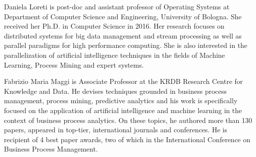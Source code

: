 \documentclass[10pt,journal,compsoc]{IEEEtran}
\theoremstyle{definition}
\theoremstyle{plain}
\begin{document}
\begin{IEEEbiography}{Daniela Loreti}
is post-doc and assistant professor of Operating Systems at Department of Computer Science and Engineering, University of Bologna. She received her Ph.D. in Computer Science in 2016. 
Her research focuses on distributed systems for big data management and stream processing as well as parallel paradigms for high performance computing. She is also interested in the parallelization of artificial intelligence techniques in the fields of Machine Learning, Process Mining and expert systems.
\end{IEEEbiography}

\begin{IEEEbiography}{Fabrizio Maria Maggi}
is Associate Professor at the KRDB Research Centre for Knowledge and Data. He devises techniques grounded in business process management, process mining, predictive analytics and his work is specifically focused on the application of artificial intelligence and machine learning in the context of business process analytics. On these topics, he authored more than 130 papers, appeared in top-tier, international journals and conferences. He is recipient of 4 best paper awards, two of which in the International Conference on Business Process Management. 
\end{IEEEbiography}
\end{document}

